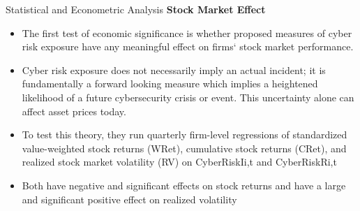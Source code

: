 \documentclass[11pt]{beamer}
\begin{document}
\begin{frame}{Statistical and Econometric Analysis}
\textbf{Stock Market Effect}

	\begin{itemize}
		\item The first test of economic significance is whether proposed measures of cyber risk exposure have any meaningful effect on firms` stock market performance. 

		\item Cyber risk exposure does not necessarily imply an actual incident; it is fundamentally a forward looking measure which implies a heightened likelihood of a future cybersecurity crisis or event. This uncertainty alone can affect asset prices today. 

		\item To test this theory, they run quarterly firm-level regressions of standardized value-weighted stock returns (WRet), cumulative stock returns (CRet), and realized stock market volatility (RV) on CyberRiskIi,t and CyberRiskRi,t

		\item Both have negative and significant effects on stock returns and have a large and significant positive effect on realized volatility
	\end{itemize}
\end{frame}
\end{document}
